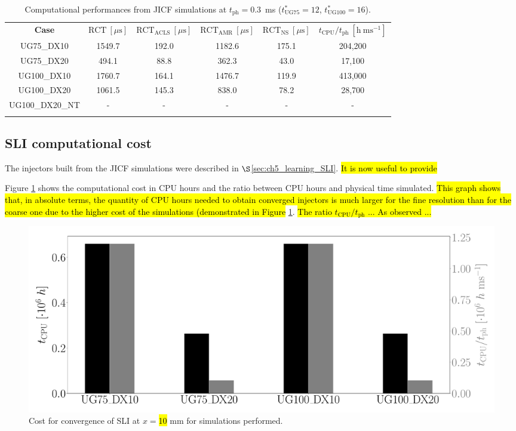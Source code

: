 \begin{table}[!h]
\centering
\caption{Computational performances from JICF simulations at $t_\mathrm{ph} = 0.3$~ms ($t^*_{\mathrm{UG}75} = 12$, $t^*_{\mathrm{UG}100} = 16$).}
\begin{tabular}{cccccc}
\thickhline
\textbf{Case} &  $\mathrm{RCT}~[\mu \mathrm{s}]$ & $\mathrm{RCT}_\mathrm{ACLS}~[\mu \mathrm{s}]$ & $\mathrm{RCT}_\mathrm{AMR}~[\mu \mathrm{s}]$ & $\mathrm{RCT}_\mathrm{NS}~[\mu \mathrm{s}]$ & $t_\mathrm{CPU} / t_\mathrm{ph}  ~ [\mathrm{h}~\mathrm{ms^{-1}}]$\\
\thickhline 
UG75\_DX10 & 1549.7 & 192.0 & 1182.6 & 175.1 & 204,200 \\
UG75\_DX20 & 494.1 & 88.8 & 362.3 & 43.0 & 17,100  \\
UG100\_DX10 & 1760.7 & 164.1 & 1476.7 & 119.9 & 413,000 \\
UG100\_DX20 & 1061.5 & 145.3 & 838.0 & 78.2 & 28,700  \\
UG100\_DX20\_NT & - & - & - & - & - \\
\thickhline
\end{tabular}
\label{tab:jicf_computational_performances}
\end{table}


\subsection{SLI computational cost}

The injectors built from the JICF simulations were described in $\S$\ref{sec:ch5_learning_SLI}. \hl{It is now useful to provide }

Figure \ref{fig:SLI_cost_convergence_all} shows the computational cost in CPU hours and the ratio between CPU hours and physical time simulated. \hl{This graph shows that, in absolute terms, the quantity of CPU hours needed to obtain converged injectors is much larger for the fine resolution than for the coarse one due to the higher cost of the simulations (demonstrated in Figure} \ref{tab:jicf_computational_performances}. \hl{The ratio $t_\mathrm{CPU}/t_\mathrm{ph}$ ... As observed ...}

\begin{figure}[ht]
	\centering
   \includegraphics[scale=0.225]{./part2_developments/figures_ch5_resolved_JICF/SLI_cost_for_convergence/cost_all_simulations}
   \caption{Cost for convergence of SLI at $x = $\hl{10} mm for simulations performed.}
   \label{fig:SLI_cost_convergence_all}
\end{figure}

